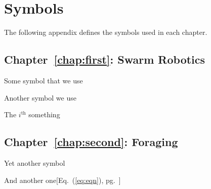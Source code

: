 
\chapter{Symbols}
\label{app:symbols}

The following appendix defines the symbols used in each chapter.  

\section{Chapter~\ref{chap:first}: Swarm Robotics}
\label{sec:symbols:swarmrobotics}

\begin{description}
\setlength{\itemsep}{-1mm}
	\item[\parbox{\namewidth}{$\cal A$}] Some symbol that we use
	\item[\parbox{\namewidth}{$m$}] Another symbol we use
	\item[\parbox{\namewidth}{$t_{i}$}] The $i^{\mathrm{th}}$ something
\end{description}


\section{Chapter~\ref{chap:second}: Foraging}
\label{sec:symbols:foraging}

\begin{description}
\setlength{\itemsep}{-1mm}
	\item[\parbox{\namewidth}{$\beta$}] Yet another symbol
	\item[\parbox{\namewidth}{$\eta(t)$}] And another one\hfill[Eq.~(\ref{eq:eqn}), pg.~\pageref{eq:eqn}]
\end{description}

